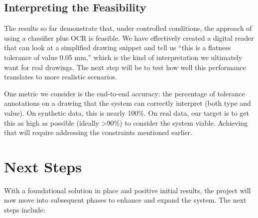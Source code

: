 \documentclass[11pt,a4paper]{article}
\begin{document}
\subsection*{Interpreting the Feasibility}
The results so far demonstrate that, under controlled conditions, the approach of using a classifier plus OCR is feasible. We have effectively created a digital reader that can look at a simplified drawing snippet and tell us “this is a flatness tolerance of value 0.05 mm,” which is the kind of interpretation we ultimately want for real drawings. The next step will be to test how well this performance translates to more realistic scenarios.

One metric we consider is the end-to-end accuracy: the percentage of tolerance annotations on a drawing that the system can correctly interpret (both type and value). On synthetic data, this is nearly 100\%. On real data, our target is to get this as high as possible (ideally >90\%) to consider the system viable. Achieving that will require addressing the constraints mentioned earlier.

\section{Next Steps}
With a foundational solution in place and positive initial results, the project will now move into subsequent phases to enhance and expand the system. The next steps include:
\end{document}
